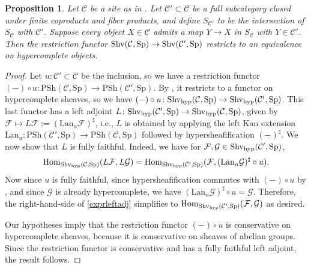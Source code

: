 \documentclass{amsart}
\newcommand{\sF}{\mathcal{F}}
\renewcommand{\sp}{\mathrm{Sp}}
\newcommand{\psh}{\mathrm{PSh}}
\newtheorem{proposition}[theorem]{Proposition}
\renewcommand{\hom}{\mathrm{Hom}}
\theoremstyle{definition}
\begin{document}
\begin{proposition} 
Let $\mathcal{C}$ be a site as in . 
Let $\mathcal{C}' \subset \mathcal{C}$ be a full subcategory closed under finite
coproducts and fiber products, and define $S_{\mathcal{C}'}$ to be the
intersection of $S_{\mathcal{C}}$ with $\mathcal{C}'$. 
Suppose every object $X \in \mathcal{C}$ admits a map $Y \to X$ in
$S_{\mathcal{C}}$ with $Y \in \mathcal{C}'$. 
Then the restriction functor 
$\shv(\mathcal{C}, \sp) \to \shv(\mathcal{C}', \sp)$ restricts to an
equivalence on hypercomplete objects. 
\end{proposition} 
\newcommand{\sG}{\mathcal{G}}
\begin{proof} 
Let $u \colon \mathcal{C}' \subset \mathcal{C}$ be the inclusion, so we have a
restriction functor $(-) \circ u \colon \psh(\mathcal{C}, \sp) \to
\psh(\mathcal{C}', \sp)$. 
By , it restricts to a functor on hypercomplete
sheaves, so we have $(-) \circ u \colon \shvh(\mathcal{C}, \sp) \to
\shvh(\mathcal{C}', \sp)$. 
This last functor has a left adjoint $L \colon 
\shvh(\mathcal{C}', \sp) \to \shvh(\mathcal{C}, \sp)
$, given by $\sF \mapsto L\mathcal{F} := (\mathrm{Lan}_u
\mathcal{F})^{\sharp}$, i.e., $L$ is obtained by applying the left Kan extension $\mathrm{Lan}_u
\colon \psh(\mathcal{C}', \sp) \to \psh(\mathcal{C}, \sp)$ followed by
hypersheafification $(-)^{\sharp}$. 
We now show that $L$ is fully faithful. Indeed, we have
for $\sF, \sG \in \shvh(\mathcal{C}', \sp)$,
\begin{equation} 
\hom_{\shvh(\mathcal{C}, \sp) }( L \mathcal{F}, L \mathcal{G})  = 
\hom_{\shvh( \mathcal{C}', \sp)}(\mathcal{F}, (\mathrm{Lan}_u \mathcal{G})^{\sharp} \circ u
).
\label{exprleftadj}
\end{equation} 
Now since $u$ is fully faithful,  since hypersheafification commutes with $(-)
\circ u$ by , and since 
$\mathcal{G}$ is
already hypercomplete, we have
$(\mathrm{Lan}_u \mathcal{G})^{\sharp} \circ u = \mathcal{G} $. 
Therefore, the right-hand-side of \eqref{exprleftadj} simplifies to $\hom_{\shvh(\mathcal{C}',
\sp)}(\mathcal{F}, \mathcal{G})$ as desired. 


Our hypotheses imply that the restriction 
functor
$(-) \circ u$ 
is conservative on hypercomplete sheaves, because it is conservative on sheaves
of abelian groups. 
Since the restriction functor is conservative and has a fully faithful 
left adjoint, the result follows. 
\end{proof} 
\end{document}
